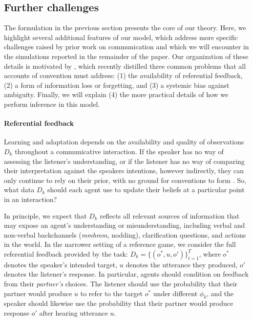 \subsection{Further challenges}

The formulation in the previous section presents the core of our theory.
Here, we highlight several additional features of our model, which address more specific challenges raised by prior work on communication and which we will encounter in the simulations reported in the remainder of the paper. 
Our organization of these details is motivated by , which recently distilled three common problems that all accounts of convention must address: (1) the availability of referential feedback, (2) a form of information loss or forgetting, and (3) a systemic bias against ambiguity.
Finally, we will explain (4) the more practical details of how we perform inference in this model. 

\paragraph{Referential feedback}

Learning and adaptation depends on the availability and quality of observations $D_k$ throughout a communicative interaction.
If the speaker has no way of assessing the listener's understanding, or if the listener has no way of comparing their interpretation against the speakers intentions, however indirectly, they can only continue to rely on their prior, with no ground for conventions to form  \cite{KraussWeinheimer66_Tangrams,HupetChantraine92_CollaborationOrRepitition,GarrodFayLeeOberlanderMacLeod07_GraphicalSymbolSystems}.
So, what data $D_k$ should each agent use to update their beliefs at a particular point in an interaction?

In principle, we expect that $D_k$ reflects all relevant sources of information that may expose an agent's understanding or misunderstanding, including verbal and non-verbal backchannels (\emph{mmhmm}, nodding), clarification questions, and actions in the world.
In the narrower setting of a reference game, we consider the full referential feedback provided by the task: $D_k = \{(o^*, u, o')\}_{t=1}^T$, where $o^*$ denotes the speaker's intended target, $u$ denotes the utterance they produced, $o'$ denotes the listener's response.
In particular, agents should condition on feedback from their \emph{partner's} choices.
The listener should use the probability that their partner would produce $u$ to refer to the target $o^*$ under different $\phi_k$, and the speaker should likewise use the probability that their partner would produce response $o'$ after hearing utterance $u$.

